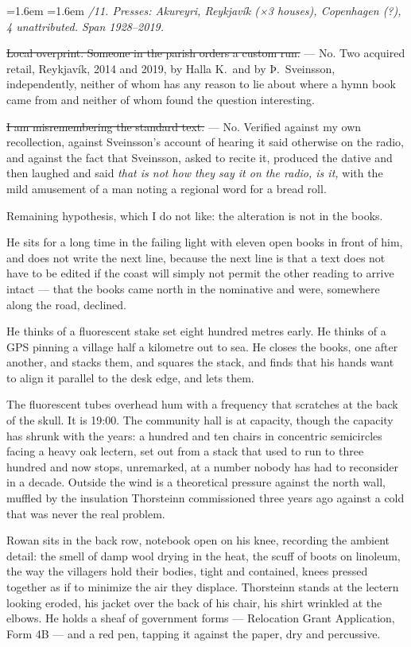 \documentclass[11pt,oneside]{book}
\newcommand{\sceneline}{%
  \par\vspace{1.2em}
  \begin{center}
    \fontsize{11}{11}\selectfont \textbullet\quad\textbullet\quad\textbullet
  \end{center}
  \vspace{0.6em}\noindent\ignorespaces
}
\newenvironment{fieldnote}
  {\par\vspace{0.9em}\begingroup
   \leftskip=1.6em \rightskip=1.6em
   \fontsize{10}{12.4}\selectfont\itshape
   \setlength{\parindent}{0pt}\noindent\ignorespaces}
  {\par\endgroup\vspace{0.9em}\noindent\ignorespaces}
\newcommand{\struck}[1]{\sout{#1}}
\begin{document}
\begin{fieldnote}
11/11. Presses: Akureyri, Reykjavík (×3 houses), Copenhagen (?), 4
unattributed. Span 1928--2019.

\struck{Local overprint. Someone in the parish orders a custom run.}
--- No. Two acquired retail, Reykjavík, 2014 and 2019, by Halla K.\ and
by Þ.\ Sveinsson, independently, neither of whom has any reason to lie
about where a hymn book came from and neither of whom found the question
interesting.

\struck{I am misremembering the standard text.}
--- No. Verified against my own recollection, against Sveinsson's
account of hearing it said otherwise on the radio, and against the fact
that Sveinsson, asked to recite it, produced the dative and then
laughed and said \emph{that is not how they say it on the radio, is it,}
with the mild amusement of a man noting a regional word for a bread
roll.

Remaining hypothesis, which I do not like: the alteration is not in the
books.
\end{fieldnote}

He sits for a long time in the failing light with eleven open books in
front of him, and does not write the next line, because the next line is
that a text does not have to be edited if the coast will simply not
permit the other reading to arrive intact --- that the books came north
in the nominative and were, somewhere along the road, declined.

He thinks of a fluorescent stake set eight hundred metres early. He
thinks of a GPS pinning a village half a kilometre out to sea. He closes
the books, one after another, and stacks them, and squares the stack,
and finds that his hands want to align it parallel to the desk edge, and
lets them.

\sceneline

The fluorescent tubes overhead hum with a frequency that scratches at
the back of the skull. It is 19:00. The community hall is at capacity,
though the capacity has shrunk with the years: a hundred and ten chairs
in concentric semicircles facing a heavy oak lectern, set out from a
stack that used to run to three hundred and now stops, unremarked, at a
number nobody has had to reconsider in a decade. Outside the wind is a
theoretical pressure against the north wall, muffled by the insulation
Thorsteinn commissioned three years ago against a cold that was never
the real problem.

Rowan sits in the back row, notebook open on his knee, recording the
ambient detail: the smell of damp wool drying in the heat, the scuff of
boots on linoleum, the way the villagers hold their bodies, tight and
contained, knees pressed together as if to minimize the air they
displace. Thorsteinn stands at the lectern looking eroded, his jacket
over the back of his chair, his shirt wrinkled at the elbows. He holds a
sheaf of government forms --- Relocation Grant Application, Form 4B ---
and a red pen, tapping it against the paper, dry and percussive.
\end{document}
